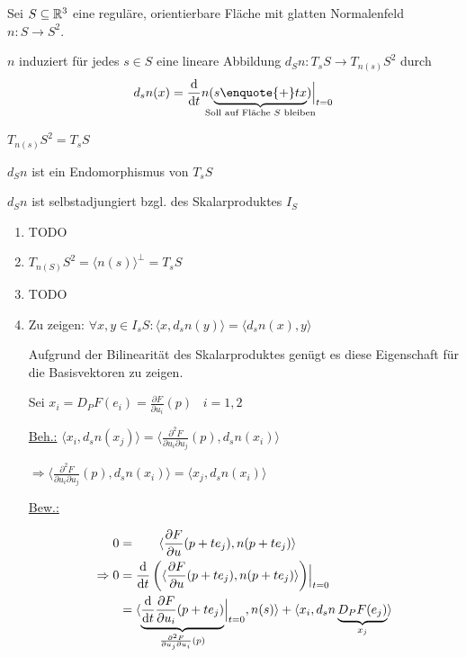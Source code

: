 \begin{proposition}
    Sei $S \subseteq \mathbb{R}^3$ eine reguläre, orientierbare Fläche mit glatten
    Normalenfeld $n: S \rightarrow S^2$.

    \begin{propenum}
        \item $n$ induziert für jedes $s \in S$ eine lineare Abbildung $d_S n: T_s S \rightarrow T_{n(s)} S^2$
              durch 
              \[d_s n(x) = \frac{\mathrm{d}}{\mathrm{d} t} n (\underbrace{s \text{\enquote{+}} tx}_{\mathclap{\text{Soll auf Fläche $S$ bleiben}}}) \Bigr |_{t=0}\]
        \item $T_{n(s)} S^2 = T_s S$
        \item $d_S n$ ist ein Endomorphismus von $T_s S$
        \item $d_S n$ ist selbstadjungiert bzgl. des Skalarproduktes $I_S$
    \end{propenum}
\end{proposition}

\begin{beweis}\leavevmode
    \begin{enumerate}[label=\alph*)]
        \item TODO
        \item $T_{n(S)} S^2 = \langle n(s) \rangle^\bot = T_s S$
        \item TODO
        \item Zu zeigen: $\forall x,y \in I_s S: \langle x, d_s n (y) \rangle = \langle d_s n(x), y \rangle$

        Aufgrund der Bilinearität des Skalarproduktes genügt es diese Eigenschaft
        für die Basisvektoren zu zeigen.

        Sei $x_i = D_P F(e_i) = \frac{\partial F}{\partial u_i} (p)\;\;\; i = 1,2$

        \underline{Beh.:} $\langle x_i, d_s n(x_j) \rangle = \langle \frac{\partial^2 F}{\partial u_i \partial u_j} (p), d_s n (x_i) \rangle$

        $\Rightarrow \langle \frac{\partial^2 F}{\partial u_i \partial u_j} (p), d_s n (x_i) \rangle = \langle x_j, d_s n (x_i) \rangle$

        \underline{Bew.:} 

        \begin{align*}
            0 &= \hphantom{\frac{\mathrm{d}}{\mathrm{d}t} \left (\right.} \langle \frac{\partial F}{\partial u} (p + t e_j), n(p + t e_j) \rangle\\
\Rightarrow 0 &= \frac{\mathrm{d}}{\mathrm{d}t} \left (\langle \frac{\partial F}{\partial u} (p + t e_j), n(p + t e_j) \rangle \right) \Bigr |_{t=0}\\
              &= \langle \underbrace{\frac{\mathrm{d}}{\mathrm{d}t} \frac{\partial F}{\partial u_i} (p + t e_j)}_{\frac{\partial^2 F}{\partial u_j \partial u_i} (p)} \Bigr |_{t=0}, n(s) \rangle + \langle x_i, d_s n \underbrace{D_P F (e_j)}_{x_j}\rangle
        \end{align*}
    \end{enumerate}
\end{beweis}